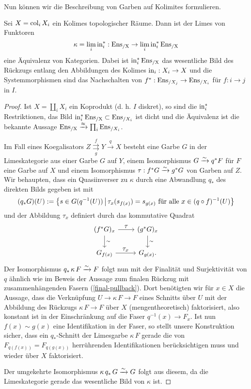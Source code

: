 Nun können wir die Beschreibung von Garben auf Kolimites formulieren.
\begin{satz} \label{sheaf-col}
  Sei $X = \operatorname{col}_i X_i$ ein Kolimes topologischer Räume. Dann ist der
  Limes von Funktoren
  \[ \kappa = \lim_i \operatorname{in}_i^*: \operatorname{Ens_{/X}} \to \lim_i \operatorname{in}_i^* \operatorname{Ens_{/X}} \]
  eine Äquivalenz von Kategorien. Dabei ist $\operatorname{in}_i^* \operatorname{Ens_{/X}}$ das
  wesentliche Bild des Rückzugs entlang den Abbildungen des Kolimes
  $\operatorname{in}_i: X_i \to X$ und die Systemmorphismen sind das Nachschalten
  von $f^*: \operatorname{Ens}_{/X_j} \to \operatorname{Ens}_{/X_i}$ für $f: i \to j$ in $I$.
\end{satz}
\begin{proof}
  Ist $X = \coprod_i X_i$ ein Koprodukt (d. h. $I$ diskret), so sind
  die $\operatorname{in}_i^*$ Restriktionen, das Bild $\operatorname{in}_i^* \operatorname{Ens_{/X}} \subset
  \operatorname{Ens}_{/X_i}$ ist dicht und die Äquivalenz ist die bekannte Aussage
  $\operatorname{Ens_{/X}} \xrightarrow{\approx} \prod_i \operatorname{Ens}_{/X_i}$.

  Im Fall eines Koegalisators $Z
  \overset{f}{\underset{g}{\rightrightarrows}} Y \xrightarrow{q} X$
  besteht eine Garbe $G$ in der Limeskategorie aus einer Garbe $G$ auf
  $Y$, einem Isomorphismus $G \xrightarrow[]{\sim} q^* F$ für $F$ eine Garbe auf $X$
  und einem Isomorphismus $\tau: f^* G \xrightarrow[]{\sim} g^* G$ von Garben auf
  $Z$. Wir behaupten, dass ein Quasiinverser zu $\kappa$ durch eine
  Abwandlung $q_*$ des direkten Bilds gegeben ist mit
  \[ (q_* G)(U) := \left\{ s \in G(q^{-1}(U)) \,\middle|\, \tau_x(s_{f(x)}) = s_{g(x)}
    \text{ für alle } x \in (q \circ f)^{-1}(U)  \right\}
  \]
  und der Abbildung $\tau_x$ definiert durch das kommutative Quadrat
  \[
  \begin{tikzcd}
    (f^* G)_x \dar{\sim} \rar{\textstyle\tau} & (g^* G)_x \dar{\sim} \\
    G_{f(x)} \rar{\textstyle\tau_x} & G_{g(x)}.
  \end{tikzcd}
  \]
  Der Isomorphismus $q_* \, \kappa \, F \xrightarrow[]{\sim} F$ folgt nun mit der
  Finalität und Surjektivität von $q$ ähnlich wie im Beweis der
  Aussage zum finalen Rückzug mit zusammenhängenden Fasern
  (\ref{final-pullback}). Dort benötigten wir für $x \in X$ die
  Aussage, dass die Verknüpfung $U \to \kappa \,F \to F$ eines
  Schnitts über $U$ mit der Abbildung des Rückzugs $\kappa \, F \to F$
  über $X$ (mengentheoretisch) faktorisiert, also konstant ist in der
  Einschränkung auf die Faser $q^{-1}(x) \to F_x$. Ist nun $f(x) \sim
  g(x)$ eine Identifikation in der Faser, so stellt unsere
  Konstruktion sicher, dass ein $q_*$-Schnitt der Limesgarbe $\kappa
  \, F$ gerade die von $F_{q(f(x))} = F_{q(g(x))}$ herrührenden
  Identifikationen berücksichtigen muss und wieder über $X$
  faktorisiert.

  Der umgekehrte Isomorphismus $\kappa \, q_* \, G \xrightarrow[]{\sim} G$ folgt aus
  diesem, da die Limeskategorie gerade das wesentliche Bild von
  $\kappa$ ist.
\end{proof}
